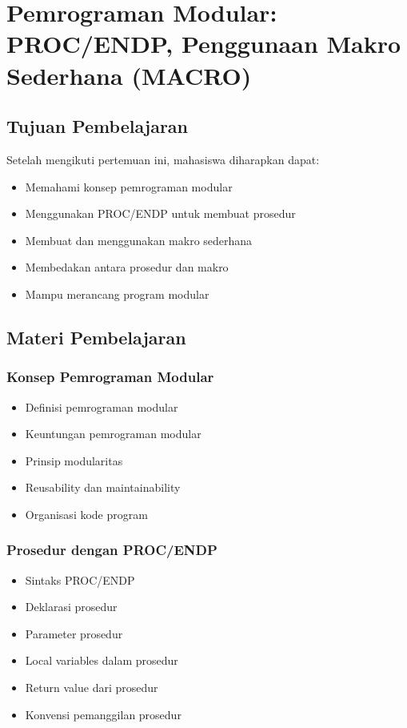 \chapter{Pemrograman Modular: PROC/ENDP, Penggunaan Makro Sederhana (MACRO)}

\section{Tujuan Pembelajaran}
Setelah mengikuti pertemuan ini, mahasiswa diharapkan dapat:
\begin{itemize}
\item Memahami konsep pemrograman modular
\item Menggunakan PROC/ENDP untuk membuat prosedur
\item Membuat dan menggunakan makro sederhana
\item Membedakan antara prosedur dan makro
\item Mampu merancang program modular
\end{itemize}

\section{Materi Pembelajaran}

\subsection{Konsep Pemrograman Modular}
\begin{itemize}
\item Definisi pemrograman modular
\item Keuntungan pemrograman modular
\item Prinsip modularitas
\item Reusability dan maintainability
\item Organisasi kode program
\end{itemize}

\subsection{Prosedur dengan PROC/ENDP}
\begin{itemize}
\item Sintaks PROC/ENDP
\item Deklarasi prosedur
\item Parameter prosedur
\item Local variables dalam prosedur
\item Return value dari prosedur
\item Konvensi pemanggilan prosedur
\end{itemize}

